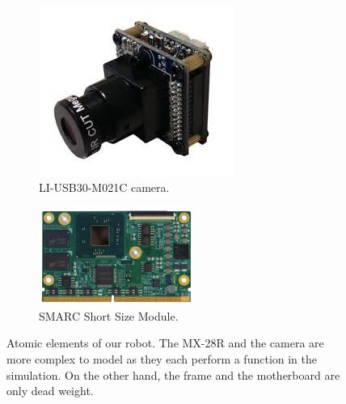 \begin{figure}[htp]
    \begin{subfigure}[b]{0.48\textwidth}
    \centering
    \includegraphics[width = \textwidth]{figures/li_cam}
    \caption{LI-USB30-M021C camera. \label{fig:li_cam}}
    \end{subfigure}
    \hfill
    \begin{subfigure}[b]{0.48\textwidth}
    \centering
    \includegraphics[width = \textwidth]{figures/smarc}
    \caption{SMARC Short Size Module. \label{fig:smarc}}
    \end{subfigure}
    \caption[Atomic elements of our robot]{Atomic elements of our robot. The MX-28R and the camera are more complex to model as they each perform a function in the simulation. On the other hand, the frame and the motherboard are only dead weight.}
    \label{fig:modelling_problem}
\end{figure}


